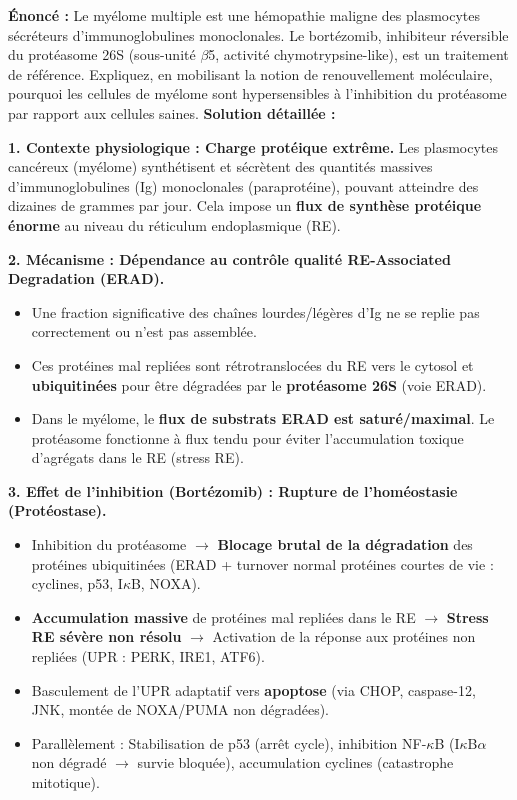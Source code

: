 \documentclass[11pt]{article}
\begin{document}
\begin{exoresolu}
\textbf{Énoncé :} Le myélome multiple est une hémopathie maligne des plasmocytes sécréteurs d'immunoglobulines monoclonales. Le bortézomib, inhibiteur réversible du protéasome 26S (sous-unité $\beta$5, activité chymotrypsine-like), est un traitement de référence. Expliquez, en mobilisant la notion de renouvellement moléculaire, pourquoi les cellules de myélome sont hypersensibles à l'inhibition du protéasome par rapport aux cellules saines.
\tcblower
\textbf{Solution détaillée :}

\textbf{1. Contexte physiologique : Charge protéique extrême.}
Les plasmocytes cancéreux (myélome) synthétisent et sécrètent des quantités massives d'immunoglobulines (Ig) monoclonales (paraprotéine), pouvant atteindre des dizaines de grammes par jour. Cela impose un \textbf{flux de synthèse protéique énorme} au niveau du réticulum endoplasmique (RE).

\textbf{2. Mécanisme : Dépendance au contrôle qualité RE-Associated Degradation (ERAD).}
\begin{itemize}
    \item Une fraction significative des chaînes lourdes/légères d'Ig ne se replie pas correctement ou n'est pas assemblée.
    \item Ces protéines mal repliées sont rétrotranslocées du RE vers le cytosol et \textbf{ubiquitinées} pour être dégradées par le \textbf{protéasome 26S} (voie ERAD).
    \item Dans le myélome, le \textbf{flux de substrats ERAD est saturé/maximal}. Le protéasome fonctionne à flux tendu pour éviter l'accumulation toxique d'agrégats dans le RE (stress RE).
\end{itemize}

\textbf{3. Effet de l'inhibition (Bortézomib) : Rupture de l'homéostasie (Protéostase).}
\begin{itemize}
    \item Inhibition du protéasome $\rightarrow$ \textbf{Blocage brutal de la dégradation} des protéines ubiquitinées (ERAD + turnover normal protéines courtes de vie : cyclines, p53, I$\kappa$B, NOXA).
    \item \textbf{Accumulation massive} de protéines mal repliées dans le RE $\rightarrow$ \textbf{Stress RE sévère non résolu} $\rightarrow$ Activation de la réponse aux protéines non repliées (UPR : PERK, IRE1, ATF6).
    \item Basculement de l'UPR adaptatif vers \textbf{apoptose} (via CHOP, caspase-12, JNK, montée de NOXA/PUMA non dégradées).
    \item Parallèlement : Stabilisation de p53 (arrêt cycle), inhibition NF-$\kappa$B (I$\kappa$B$\alpha$ non dégradé $\rightarrow$ survie bloquée), accumulation cyclines (catastrophe mitotique).
\end{itemize}


\end{exoresolu}
\end{document}
